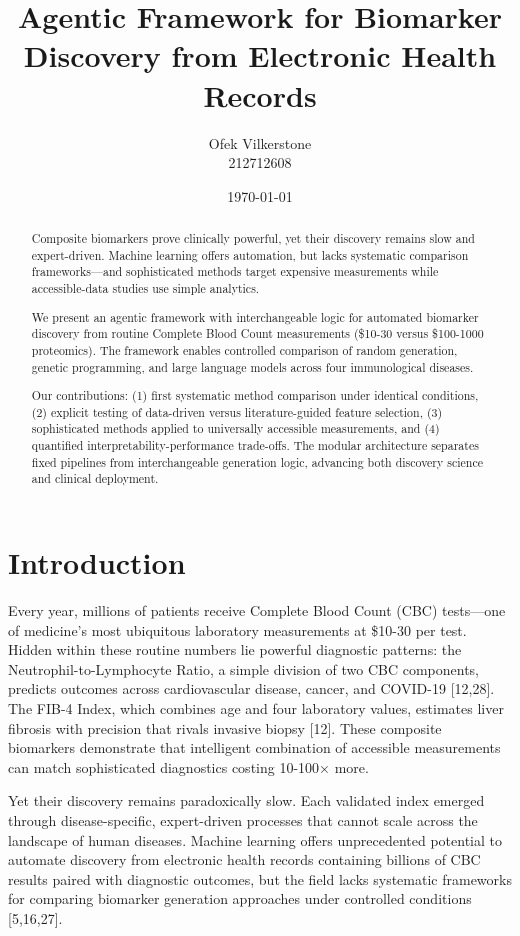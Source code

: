 \documentclass[12pt,a4paper]{article}
\title{Agentic Framework for Biomarker Discovery from Electronic Health Records}
\author{Ofek Vilkerstone \\ 212712608}
\date{\today}
\begin{document}
\maketitle

\begin{abstract}
Composite biomarkers prove clinically powerful, yet their discovery remains slow and expert-driven. Machine learning offers automation, but lacks systematic comparison frameworks—and sophisticated methods target expensive measurements while accessible-data studies use simple analytics.

We present an agentic framework with interchangeable logic for automated biomarker discovery from routine Complete Blood Count measurements (\$10-30 versus \$100-1000 proteomics). The framework enables controlled comparison of random generation, genetic programming, and large language models across four immunological diseases.

Our contributions: (1) first systematic method comparison under identical conditions, (2) explicit testing of data-driven versus literature-guided feature selection, (3) sophisticated methods applied to universally accessible measurements, and (4) quantified interpretability-performance trade-offs. The modular architecture separates fixed pipelines from interchangeable generation logic, advancing both discovery science and clinical deployment.
\end{abstract}
\newpage
\setcounter{tocdepth}{2} 
\tableofcontents
\newpage

\section{Introduction}

Every year, millions of patients receive Complete Blood Count (CBC) tests—one of medicine's most ubiquitous laboratory measurements at \$10-30 per test. Hidden within these routine numbers lie powerful diagnostic patterns: the Neutrophil-to-Lymphocyte Ratio, a simple division of two CBC components, predicts outcomes across cardiovascular disease, cancer, and COVID-19 [12,28]. The FIB-4 Index, which combines age and four laboratory values, estimates liver fibrosis with precision that rivals invasive biopsy [12]. These composite biomarkers demonstrate that intelligent combination of accessible measurements can match sophisticated diagnostics costing 10-100× more.

Yet their discovery remains paradoxically slow. Each validated index emerged through disease-specific, expert-driven processes that cannot scale across the landscape of human diseases. Machine learning offers unprecedented potential to automate discovery from electronic health records containing billions of CBC results paired with diagnostic outcomes, but the field lacks systematic frameworks for comparing biomarker generation approaches under controlled conditions [5,16,27].
\end{document}
